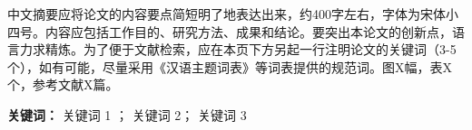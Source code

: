 \cleardoublepage{}

\begin{chineseabstract}	

中文摘要应将论文的内容要点简短明了地表达出来，约400字左右，字体为宋体小四号。内容应包括工作目的、研究方法、成果和结论。要突出本论文的创新点，语言力求精炼。为了便于文献检索，应在本页下方另起一行注明论文的关键词（3-5个），如有可能，尽量采用《汉语主题词表》等词表提供的规范词。图X幅，表X个，参考文献X篇。

{
    \vspace{2cm}
    \noindent
    \textbf{关键词：} 关键词 1 ； 关键词 2； 关键词 3 \par %
}
	
	
	
	
	
	
	
	
	
\end{chineseabstract}
